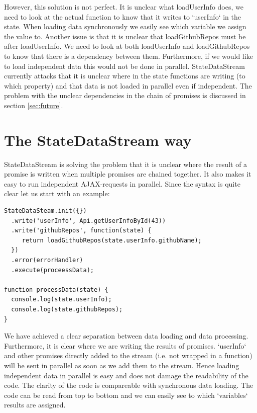 \documentclass[a4paper,12pt]{article}
\begin{document}
However, this solution is not perfect. It is unclear what loadUserInfo does, we need to look at the actual function to know that it writes to `userInfo` in the state. When loading data
synchronously we easily see which variable we assign the value to. Another issue is that it is unclear that loadGithubRepos must be after loadUserInfo. We need to look at both loadUserInfo and loadGithubRepos to know that there
is a dependency between them. Furthermore, if we would like to load independent data this would not be done in parallel. 
StateDataStream currently attacks that it is unclear where in the state functions are writing (to which property) and that data is not loaded in parallel even if independent.
The problem with the unclear dependencies in the chain of promises is discussed in section \ref{sec:future}.

\clearpage

\section{The StateDataStream way}
StateDataStream is solving the problem that it is unclear where the result of a promise is written when multiple promises are chained together. 
It also makes it easy to run independent AJAX-requests in parallel. Since the syntax is quite clear let us start with an example:

\begin{lstlisting}[caption={Code showing how two pieces of data, where the second is dependent on the first, can be loaded using StateDataStream.}, frame=single]
StateDataSteam.init({})
  .write('userInfo', Api.getUserInfoById(43))
  .write('githubRepos', function(state) {
     return loadGithubRepos(state.userInfo.githubName);
  })
  .error(errorHandler)
  .execute(proceessData);

function processData(state) {
  console.log(state.userInfo);
  console.log(state.githubRepos);
}
\end{lstlisting}
We have achieved a clear separation between data loading and data processing. Furthermore, it is clear where we are writing the results of promises. `userInfo` and other promises directly added to the stream (i.e. not wrapped in a function) will be sent in parallel as soon as we add them to the stream. Hence loading independent data in parallel is easy and does not damage the readability of the code.
The clarity of the code is compareable with synchronous data loading. The code can be read from top to bottom and we can easily see to which `variables` results are assigned.
\end{document}
